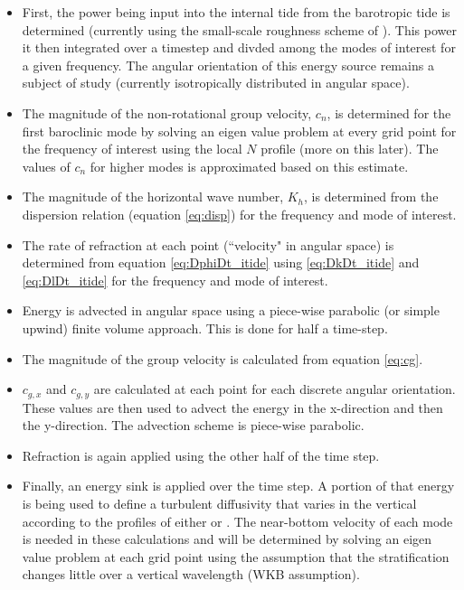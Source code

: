 \documentclass[12pt]{article}
\begin{document}
\begin{itemize}
	\item First, the power being input into the internal tide from the barotropic tide is determined (currently using the small-scale roughness scheme of \cite{Jayne&StLaurent02}). This power it then integrated over a timestep and divded among the modes of interest for a given frequency. The angular orientation of this energy source remains a subject of study (currently isotropically distributed in angular space).
	\item The magnitude of the non-rotational group velocity, $c_n$, is determined for the first baroclinic mode by solving an eigen value problem at every grid point for the frequency of interest using the local $N$ profile (more on this later). The values of $c_n$ for higher modes is approximated based on this estimate.
	\item The magnitude of the horizontal wave number, $K_h$, is determined from the dispersion relation (equation \ref{eq:disp}) for the frequency and mode of interest.
	\item The rate of refraction at each point (``velocity" in angular space) is determined from equation \ref{eq:DphiDt_itide} using \ref{eq:DkDt_itide} and \ref{eq:DlDt_itide} for the frequency and mode of interest.
	\item Energy is advected in angular space using a piece-wise parabolic (or simple upwind) finite volume approach. This is done for half a time-step.
	\item The magnitude of the group velocity is calculated from equation \ref{eq:cg}.
	\item $c_{g,x}$ and $c_{g,y}$ are calculated at each point for each discrete angular orientation. These values are then used to advect the energy in the x-direction and then the y-direction. The advection scheme is piece-wise parabolic.
	\item Refraction is again applied using the other half of the time step.
	\item Finally, an energy sink is applied over the time step. A portion of that energy is being used to define a turbulent diffusivity that varies in the vertical according to the profiles of either \cite{SimmonsEtAl04} or \cite{Polzin09}. The near-bottom velocity of each mode is needed in these calculations and will be determined by solving an eigen value problem at each grid point using the assumption that the stratification changes little over a vertical wavelength (WKB assumption).
\end{itemize}
\end{document}
